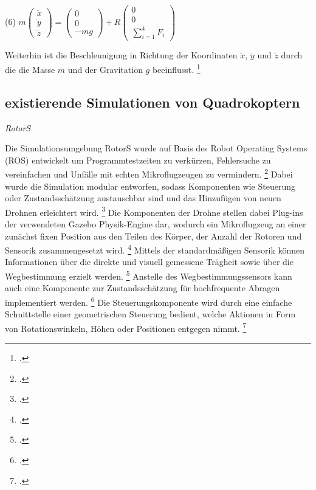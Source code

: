 \begin{description}
    \item \begin{center} (6) $m\begin{pmatrix} \ddot x \\ \ddot y \\ \ddot z \end{pmatrix} = \begin{pmatrix}0 \\ 0 \\ -mg\end{pmatrix} + R\begin{pmatrix} 0 \\ 0 \\ \sum_{i=1}^{4} F_{i} \end{pmatrix}$ \end{center}
\end{description}
Weiterhin ist die Beschleunigung in Richtung der Koordinaten $\ddot x$, $\ddot y$ und $\ddot z$ durch die die Masse $m$ und der Gravitation $g$ beeinflusst. \footcite[Vgl.][S. 3]{Deshpande.2020}

\subsection{existierende Simulationen von Quadrokoptern}

\textit{RotorS}

Die Simulationsumgebung RotorS wurde auf Basis des Robot Operating Systems (ROS) entwickelt um Programmtestzeiten zu verkürzen, Fehlersuche zu vereinfachen und Unfälle mit echten Mikroflugzeugen zu vermindern. \footcite[Vgl.][S. 596]{Furrer.2016}
Dabei wurde die Simulation modular entworfen, sodass Komponenten wie Steuerung oder Zustandsschätzung austauschbar sind und das Hinzufügen von neuen Drohnen erleichtert wird. \footcite[Vgl.][S. 595]{Furrer.2016}
Die Komponenten der Drohne stellen dabei Plug-ins der verwendeten Gazebo Physik-Engine dar, wodurch ein Mikroflugzeug an einer zunächst fixen Position aus den Teilen des Körper, der Anzahl der Rotoren und Sensorik zusammengesetzt wird. \footcite[Vgl.][S. 597]{Furrer.2016}
Mittels der standardmäßigen Sensorik können Informationen über die direkte und visuell gemessene Trägheit sowie über die Wegbestimmung erzielt werden. \footcite[Vgl.][S. 597]{Furrer.2016}
Anstelle des Wegbestimmungssensors kann auch eine Komponente zur Zustandsschätzung für hochfrequente Abragen implementiert werden. \footcite[Vgl.][S. 598]{Furrer.2016}
Die Steuerungskomponente wird durch eine einfache Schnittstelle einer geometrischen Steuerung bedient, welche Aktionen in Form von Rotationswinkeln, Höhen oder Positionen entgegen nimmt. \footcite[Vgl.][S. 598]{Furrer.2016}

